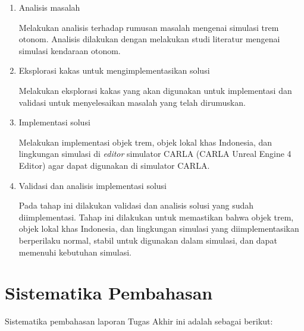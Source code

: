 \begin{enumerate}

    \item Analisis masalah

    Melakukan analisis terhadap rumusan masalah mengenai simulasi trem otonom.
    Analisis dilakukan dengan melakukan studi literatur mengenai simulasi
    kendaraan otonom.

    \item Eksplorasi kakas untuk mengimplementasikan solusi

    Melakukan eksplorasi kakas yang akan digunakan untuk implementasi dan
    validasi untuk menyelesaikan masalah yang telah dirumuskan.

    \item Implementasi solusi

    Melakukan implementasi objek trem, objek lokal khas Indonesia, dan
    lingkungan simulasi di \textit{editor} simulator CARLA (CARLA Unreal Engine
    4 Editor) agar dapat digunakan di simulator CARLA.

    \item Validasi dan analisis implementasi solusi

    Pada tahap ini dilakukan validasi dan analisis solusi yang sudah
    diimplementasi. Tahap ini dilakukan untuk memastikan bahwa objek trem, objek
    lokal khas Indonesia, dan lingkungan simulasi yang diimplementasikan
    berperilaku normal, stabil untuk digunakan dalam simulasi, dan dapat
    memenuhi kebutuhan simulasi.

\end{enumerate}

\section{Sistematika Pembahasan}

Sistematika pembahasan laporan Tugas Akhir ini adalah sebagai berikut:

